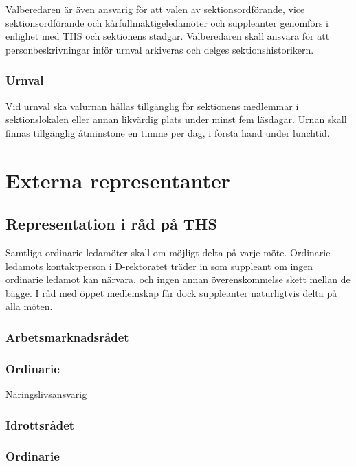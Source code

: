 \documentclass[a4paper,12pt]{article}
\begin{document}
Valberedaren är även ansvarig för att valen av sektionsordförande, vice sektionsordförande och kårfullmäktigeledamöter och suppleanter genomförs i enlighet med THS och sektionens stadgar. Valberedaren skall ansvara för att personbeskrivningar inför urnval arkiveras och delges sektionshistorikern.

\subsubsection{Urnval}

Vid urnval ska valurnan hållas tillgänglig för sektionens medlemmar i sektionslokalen eller annan likvärdig plats under minst fem läsdagar. Urnan skall finnas tillgänglig åtminstone en timme per dag, i första hand under lunchtid.

\section{Externa representanter}

\subsection{Representation i råd på THS}

Samtliga ordinarie ledamöter skall om möjligt delta på varje möte. Ordinarie ledamots kontaktperson i D-rektoratet träder in som suppleant om ingen ordinarie ledamot kan närvara, och ingen annan överenskommelse skett mellan de bägge. I råd med öppet medlemskap får dock suppleanter naturligtvis delta på alla möten.

\subsubsection{Arbetsmarknadsrådet}

\subsubsection{Ordinarie}

Näringslivsansvarig

\subsubsection{Idrottsrådet}

\subsubsection{Ordinarie}
\end{document}
